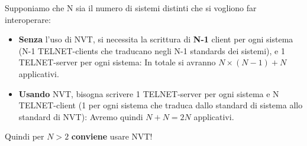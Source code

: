 \documentclass[11pt,a4paper]{article}
\theoremstyle{definition}
\begin{document}
Supponiamo che N sia il numero di sistemi distinti che si vogliono far
interoperare:
\begin{itemize}
	\item \textbf{Senza} l'uso di NVT, si necessita la scrittura di \textbf{N-1} client per ogni sistema (N-1 TELNET-clients che traducano negli N-1 standards dei sistemi), e 1 TELNET-server per ogni sistema: \newline
	      In totale si avranno $N\times(N-1) + N$ applicativi.
	\item \textbf{Usando} NVT, bisogna scrivere 1 TELNET-server per ogni sistema e N TELNET-client (1 per ogni sistema che traduca dallo standard di sistema allo standard di NVT): \newline Avremo quindi $N + N = 2N$ applicativi.
\end{itemize}
Quindi per $N > 2$ \textbf{conviene} usare NVT!
\newpage
\end{document}
